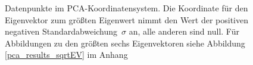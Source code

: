  \begin{figure}
   \qquad
   
   \caption{Datenpunkte im PCA-Koordinatensystem. Die Koordinate für den Eigenvektor zum größten Eigenwert nimmt den Wert der positiven \bzw negativen \mbox{Standardabweichung $\sigma$} an, alle anderen sind null. Für Abbildungen zu den größten sechs Eigenvektoren siehe Abbildung \ref{pca_results_sqrtEV} im Anhang}
   \label{pca_results_sqrtEV_biggest}
 \end{figure}

